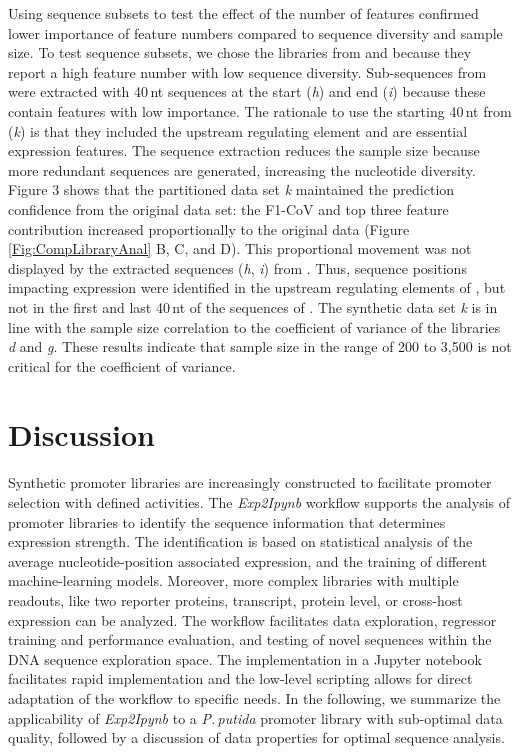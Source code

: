 \documentclass[utf8]{frontiersSCNS} %
\begin{document}
Using sequence subsets to test the effect of the number of features confirmed lower importance of feature numbers compared to sequence diversity and sample size. To test sequence subsets, we chose the libraries from \cite{Meng2013} and \cite{Zhao2020} because they report a high feature number with low sequence diversity. Sub-sequences from \cite{Meng2013} were extracted with 40\,nt sequences at the start (\textit{h}) and end (\textit{i}) because these contain features with low importance. The rationale to use the starting 40\,nt from \cite{Zhao2020} (\textit{k}) is that they included the upstream regulating element and are essential expression features. The sequence extraction reduces the sample size because more redundant sequences are generated, increasing the nucleotide diversity. Figure 3 shows that the partitioned data set \textit{k} \citep{Zhao2020} maintained the prediction confidence from the original data set: the F1-CoV and top three feature contribution increased proportionally to the original data (Figure \ref{Fig:CompLibraryAnal} B, C, and D). This proportional movement was not displayed by the extracted sequences (\textit{h}, \textit{i}) from \cite{Meng2013}. Thus, sequence positions impacting expression were identified in the upstream regulating elements of \cite{Zhao2020}, but not in the first and last 40\,nt of the sequences of \cite{Meng2013}. The synthetic data set \textit{k} is in line with the sample size correlation to the coefficient of variance of the libraries \textit{d} and \textit{g}. These results indicate that sample size in the range of 200 to 3,500 is not critical for the coefficient of variance.


\section{Discussion}
Synthetic promoter libraries are increasingly constructed to facilitate promoter selection with defined activities. The \textit{Exp2Ipynb} workflow supports the analysis of promoter libraries to identify the sequence information that determines expression strength. The identification is based on statistical analysis of the average nucleotide-position associated expression, and the training of different machine-learning models. Moreover, more complex libraries with multiple readouts, like two reporter proteins, transcript, protein level, or cross-host expression can be analyzed. The workflow facilitates data exploration, regressor training and performance evaluation, and testing of novel sequences within the DNA sequence exploration space. The implementation in a Jupyter notebook facilitates rapid implementation and the low-level scripting allows for direct adaptation of the workflow to specific needs. In the following, we summarize the applicability of \textit{Exp2Ipynb} to a \textit{P.\,putida} promoter library with sub-optimal data quality, followed by a discussion of data properties for optimal sequence analysis.
\end{document}
